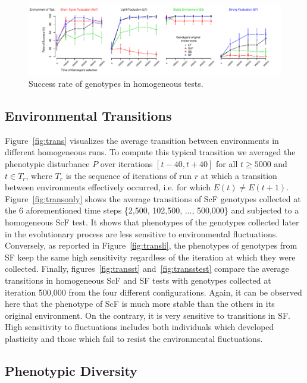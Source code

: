 \begin{figure}[t]
\centering
\includegraphics[width=2\columnwidth]{img/testSurvivingRates}
\caption{Success rate of genotypes in homogeneous tests.}
\label{fig:survrate}
\end{figure}

\subsection{Environmental Transitions}

Figure~\ref{fig:trans} visualizes the average transition between environments in different homogeneous runs. To compute this typical transition we averaged the phenotypic disturbance $P$ over iterations $[t-40, t+40]$ for all $t \ge 5000$ and $t \in T_r$, where $T_r$ is the sequence of iterations of run $r$ at which a transition between environments effectively occurred, i.e. for which $E(t) \ne E(t+1)$. Figure~\ref{fig:transonly} shows the average transitions of ScF genotypes collected at the 6 aforementioned time steps \{2,500, 102,500, ..., 500,000\} and subjected to a homogeneous ScF test. It shows that phenotypes of the genotypes collected later in the evolutionary process are less sensitive to environmental fluctuations. Conversely, as reported in Figure~\ref{fig:transli}, the phenotypes of genotypes from SF keep the same high sensitivity regardless of the iteration at which they were collected. Finally, figures~\ref{fig:transst} and~\ref{fig:transstest} compare the average transitions in homogeneous ScF and SF tests with genotypes collected at iteration 500,000 from the four different configurations. Again, it can be observed here that the phenotype of ScF is much more stable than the others in its original environment. On the contrary, it is very sensitive to transitions in SF. High sensitivity to fluctuations includes both individuals which developed plasticity and those which fail to resist the environmental fluctuations.

\subsection{Phenotypic Diversity} 


